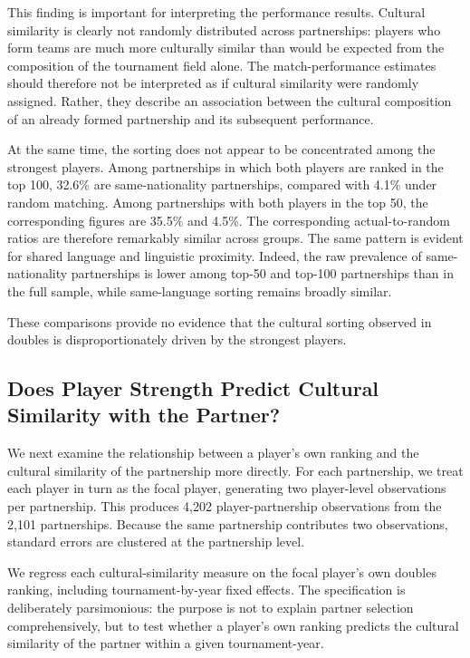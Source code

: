 \documentclass[10pt]{article}
\begin{document}
This finding is important for interpreting the performance results. Cultural similarity is clearly not randomly distributed across partnerships: players who form teams are much more culturally similar than would be expected from the composition of the tournament field alone. The match-performance estimates should therefore not be interpreted as if cultural similarity were randomly assigned. Rather, they describe an association between the cultural composition of an already formed partnership and its subsequent performance.

At the same time, the sorting does not appear to be concentrated among the strongest players. Among partnerships in which both players are ranked in the top 100, 32.6\% are same-nationality partnerships, compared with 4.1\% under random matching. Among partnerships with both players in the top 50, the corresponding figures are 35.5\% and 4.5\%. The corresponding actual-to-random ratios are therefore remarkably similar across groups. The same pattern is evident for shared language and linguistic proximity. Indeed, the raw prevalence of same-nationality partnerships is lower among top-50 and top-100 partnerships than in the full sample, while same-language sorting remains broadly similar.

These comparisons provide no evidence that the cultural sorting observed in doubles is disproportionately driven by the strongest players.

\subsection{Does Player Strength Predict Cultural Similarity with the Partner?}

We next examine the relationship between a player's own ranking and the cultural similarity of the partnership more directly. For each partnership, we treat each player in turn as the focal player, generating two player-level observations per partnership. This produces 4,202 player-partnership observations from the 2,101 partnerships. Because the same partnership contributes two observations, standard errors are clustered at the partnership level.

We regress each cultural-similarity measure on the focal player's own doubles ranking, including tournament-by-year fixed effects. The specification is deliberately parsimonious: the purpose is not to explain partner selection comprehensively, but to test whether a player's own ranking predicts the cultural similarity of the partner within a given tournament-year.
\end{document}
